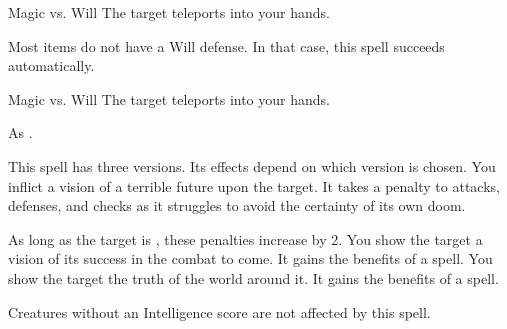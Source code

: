 \begin{spellheader}
    \spellrng{\rngclose}
\end{spellheader}
\begin{spelleffects}
    \begin{spellattack}{Magic vs. Will}
        \spellsuccess The target teleports into your hands.
    \end{spellattack}
\end{spelleffects}
\begin{spellfooter}
    \spellnotes Most items do not have a Will defense. In that case, this spell succeeds automatically.
\end{spellfooter}

\begin{spellheader}
    \spellrng{\rngmed}
\end{spellheader}
\begin{spelleffects}
    \begin{spellattack}{Magic vs. Will}
        \spelleffect The target teleports into your hands.
    \end{spellattack}
\end{spelleffects}
\begin{spellfooter}
    \spellnotes As .
\end{spellfooter}

\begin{spellheader}
    \spellrng{\rngmed}
    \spelldur{\durshort}
\end{spellheader}
\begin{spelleffects}
    \spellspecial This spell has three versions. Its effects depend on which version is chosen.
     You inflict a vision of a terrible future upon the target. It takes a  penalty to attacks, defenses, and checks as it struggles to avoid the certainty of its own doom.

    As long as the target is \bloodied, these penalties increase by 2.
     You show the target a vision of its success in the combat to come. It gains the benefits of a  spell.
     You show the target the truth of the world around it. It gains the benefits of a  spell.
\end{spelleffects}
\begin{spellfooter}
    \spellnotes Creatures without an Intelligence score are not affected by this spell.
\end{spellfooter}

